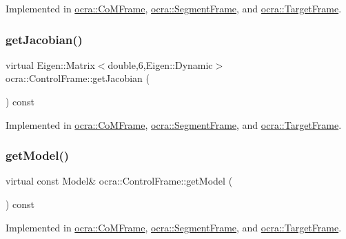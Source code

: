 Implemented in \hyperlink{classocra_1_1CoMFrame_a9e59ca65720c553da5c75f484544829c}{ocra\+::\+Co\+M\+Frame}, \hyperlink{classocra_1_1SegmentFrame_aa8f7f9544b59da591d94ac8e6a8a9e5d}{ocra\+::\+Segment\+Frame}, and \hyperlink{classocra_1_1TargetFrame_ab38d91f0d2f90b102259ec155a8a1245}{ocra\+::\+Target\+Frame}.

\hypertarget{classocra_1_1ControlFrame_a14e0b855979be5dbd360314f25191e77}{}\label{classocra_1_1ControlFrame_a14e0b855979be5dbd360314f25191e77} 
\subsubsection{\texorpdfstring{get\+Jacobian()}{getJacobian()}}
{\footnotesize\ttfamily virtual Eigen\+::\+Matrix$<$double,6,Eigen\+::\+Dynamic$>$ ocra\+::\+Control\+Frame\+::get\+Jacobian (\begin{DoxyParamCaption}{ }\end{DoxyParamCaption}) const\hspace{0.3cm}{\ttfamily [pure virtual]}}



Implemented in \hyperlink{classocra_1_1CoMFrame_ab24f3400af3e8eb2a12d6597ff8a7a31}{ocra\+::\+Co\+M\+Frame}, \hyperlink{classocra_1_1SegmentFrame_a1ece38dd51a3331dfe3de7911ad9291e}{ocra\+::\+Segment\+Frame}, and \hyperlink{classocra_1_1TargetFrame_a94d2746633b7112afae754370a3a3e1f}{ocra\+::\+Target\+Frame}.

\hypertarget{classocra_1_1ControlFrame_ab8a1e5e3d96d7524112b4c88bf0bc5ee}{}\label{classocra_1_1ControlFrame_ab8a1e5e3d96d7524112b4c88bf0bc5ee} 
\subsubsection{\texorpdfstring{get\+Model()}{getModel()}}
{\footnotesize\ttfamily virtual const Model\& ocra\+::\+Control\+Frame\+::get\+Model (\begin{DoxyParamCaption}{ }\end{DoxyParamCaption}) const\hspace{0.3cm}{\ttfamily [pure virtual]}}



Implemented in \hyperlink{classocra_1_1CoMFrame_afc280df9814e7eb2cf62f017f7bbfc2e}{ocra\+::\+Co\+M\+Frame}, \hyperlink{classocra_1_1SegmentFrame_a3a14b77753ad98507db9968b33c582e4}{ocra\+::\+Segment\+Frame}, and \hyperlink{classocra_1_1TargetFrame_acfd238567f0cfb9e6107cd17103ec6ea}{ocra\+::\+Target\+Frame}.

